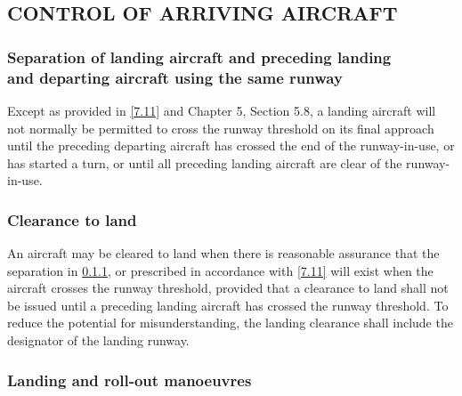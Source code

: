 \documentclass[../vATM.tex]{subfiles}
\begin{document}
    \subsection[Control of arriving aircraft]{CONTROL OF ARRIVING AIRCRAFT}

    \subsubsection[Separation of landing aircraft and preceding landing and departing aircraft using the same runway]{Separation of landing aircraft and preceding landing \\ and departing aircraft using the same runway} \label{7.10.1}

    Except as provided in \ref{7.11} and Chapter 5, Section 5.8, a landing aircraft will not normally be permitted to cross the runway threshold on its final approach until the preceding departing aircraft has crossed the end of the runway-in-use, or has started a turn, or until all preceding landing aircraft are clear of the runway-in-use.

    \subsubsection{Clearance to land}

    An aircraft may be cleared to land when there is reasonable assurance that the separation in \ref{7.10.1}, or prescribed in accordance with \ref{7.11} will exist when the aircraft crosses the runway threshold, provided that a clearance to land shall not be issued until a preceding landing aircraft has crossed the runway threshold. To reduce the potential for misunderstanding, the landing clearance shall include the designator of the landing runway.

    \subsubsection{Landing and roll-out manoeuvres}
\end{document}
